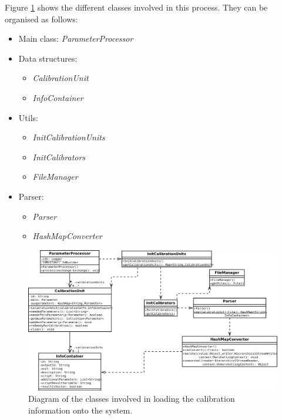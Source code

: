 Figure \ref{f5.2} shows the different classes involved in this process. They can be organised as follows:
\begin{itemize}
\item Main class: \emph{ParameterProcessor}
\item Data structures:
	\begin{itemize}
		\item \emph{CalibrationUnit}
		\item \emph{InfoContainer}
	\end{itemize}
\item Utils:
	\begin{itemize}
		\item \emph{InitCalibrationUnits}
		\item \emph{InitCalibrators}
		\item \emph{FileManager}
	\end{itemize}
\item Parser:
	\begin{itemize}
		\item \emph{Parser}
		\item \emph{HashMapConverter}
	\end{itemize}
\end{itemize}


\begin{figure}[H]
\centerline{\includegraphics[width=1.3\textwidth]{images/LoadInfoClassDiagram.png}}
\caption{Diagram of the classes involved in loading the calibration information onto the system.}
\label{f5.2}
\end{figure}




